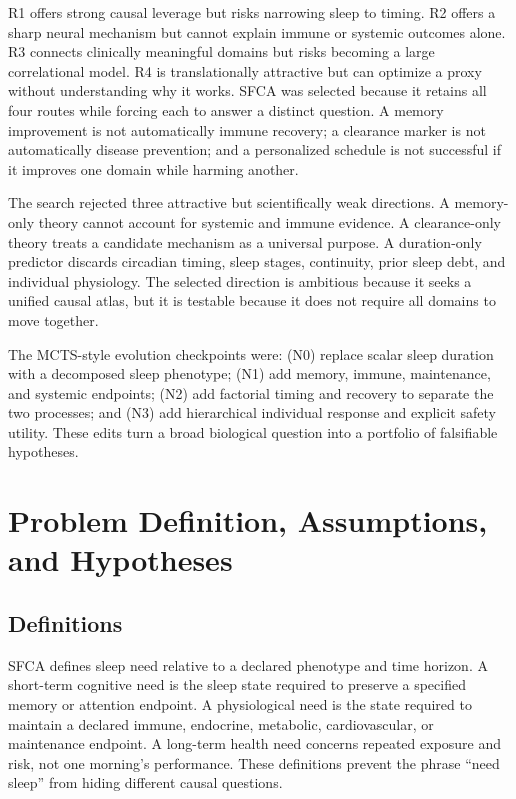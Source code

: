 \documentclass[conference]{IEEEtran}
\begin{document}
R1 offers strong causal leverage but risks narrowing sleep to timing. R2 offers a sharp neural mechanism but cannot explain immune or systemic outcomes alone. R3 connects clinically meaningful domains but risks becoming a large correlational model. R4 is translationally attractive but can optimize a proxy without understanding why it works. SFCA was selected because it retains all four routes while forcing each to answer a distinct question. A memory improvement is not automatically immune recovery; a clearance marker is not automatically disease prevention; and a personalized schedule is not successful if it improves one domain while harming another.

The search rejected three attractive but scientifically weak directions. A memory-only theory cannot account for systemic and immune evidence. A clearance-only theory treats a candidate mechanism as a universal purpose. A duration-only predictor discards circadian timing, sleep stages, continuity, prior sleep debt, and individual physiology. The selected direction is ambitious because it seeks a unified causal atlas, but it is testable because it does not require all domains to move together.

The MCTS-style evolution checkpoints were: (N0) replace scalar sleep duration with a decomposed sleep phenotype; (N1) add memory, immune, maintenance, and systemic endpoints; (N2) add factorial timing and recovery to separate the two processes; and (N3) add hierarchical individual response and explicit safety utility. These edits turn a broad biological question into a portfolio of falsifiable hypotheses.

\section{Problem Definition, Assumptions, and Hypotheses}
\subsection{Definitions}
SFCA defines sleep need relative to a declared phenotype and time horizon. A short-term cognitive need is the sleep state required to preserve a specified memory or attention endpoint. A physiological need is the state required to maintain a declared immune, endocrine, metabolic, cardiovascular, or maintenance endpoint. A long-term health need concerns repeated exposure and risk, not one morning's performance. These definitions prevent the phrase “need sleep” from hiding different causal questions.
\end{document}

